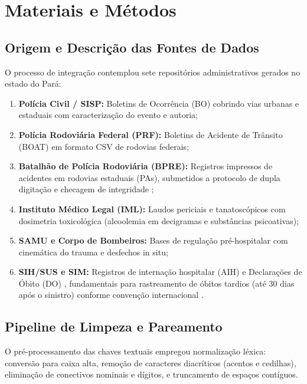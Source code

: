 \documentclass[sigconf, nonacm, screen, language=portuguese, language=spanish, language={main=english}]{acmart}
\begin{document}
\section{Materiais e Métodos}\label{sec:metodologia}

\subsection{Origem e Descrição das Fontes de Dados}
O processo de integração contemplou sete repositórios administrativos gerados no estado do Pará:
\begin{enumerate}
    \item \textbf{Polícia Civil / SISP:} Boletins de Ocorrência (BO) cobrindo vias urbanas e estaduais com caracterização do evento e autoria;
    \item \textbf{Polícia Rodoviária Federal (PRF):} Boletins de Acidente de Trânsito (BOAT) em formato CSV de rodovias federais;
    \item \textbf{Batalhão de Polícia Rodoviária (BPRE):} Registros impressos de acidentes em rodovias estaduais (PAs), submetidos a protocolo de dupla digitação e checagem de integridade \cite{rahm2000};
    \item \textbf{Instituto Médico Legal (IML):} Laudos periciais e tanatoscópicos com dosimetria toxicológica (alcoolemia em decigramas e substâncias psicoativas);
    \item \textbf{SAMU e Corpo de Bombeiros:} Bases de regulação pré-hospitalar com cinemática do trauma e desfechos in situ;
    \item \textbf{SIH/SUS e SIM:} Registros de internação hospitalar (AIH) \cite{veras1994} e Declarações de Óbito (DO) \cite{brasil2011, mellojorge2007}, fundamentais para rastreamento de óbitos tardios (até 30 dias após o sinistro) conforme convenção internacional \cite{who2018}.
\end{enumerate}

\subsection{Pipeline de Limpeza e Pareamento}
O pré-processamento das chaves textuais empregou normalização léxica: conversão para caixa alta, remoção de caracteres diacríticos (acentos e cedilhas), eliminação de conectivos nominais e dígitos, e truncamento de espaços contíguos.
\end{document}

